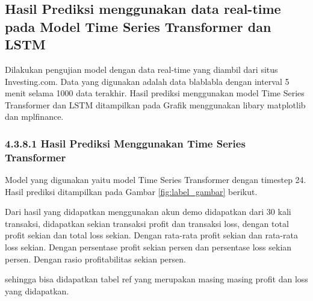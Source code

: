 \subsection{Hasil Prediksi menggunakan data real-time pada Model Time Series Transformer dan LSTM}

Dilakukan pengujian model dengan data real-time yang diambil dari situs Investing.com. Data yang digunakan adalah data blablabla dengan interval 5 menit selama 1000 data terakhir. Hasil prediksi menggunakan model Time Series Transformer dan LSTM ditampilkan pada Grafik menggunakan libary matplotlib dan mplfinance. 

\subsubsection*{4.3.8.1 Hasil Prediksi Menggunakan Time Series Transformer}
Model yang digunakan yaitu model Time Series Transformer dengan timestep 24. Hasil prediksi ditampilkan pada Gambar \ref{fig:label_gambar} berikut.


Dari hasil yang didapatkan menggunakan akun demo didapatkan dari 30 kali transaksi, didapatkan sekian transaksi profit dan transaksi loss, dengan total profit sekian dan total loss sekian. Dengan rata-rata profit sekian dan rata-rata loss sekian. Dengan persentase profit sekian persen dan persentase loss sekian persen. Dengan rasio profitabilitas sekian persen.

sehingga bisa didapatkan tabel ref yang merupakan masing masing profit dan loss yang didapatkan. 

